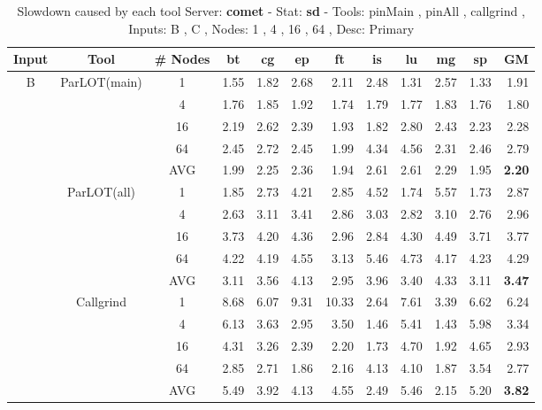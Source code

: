 \begin{table*}[]
\caption{Slowdown caused by each tool Server: \textbf{comet} - 
 Stat: \textbf{sd} - 
 Tools: pinMain , pinAll , callgrind ,  
 Inputs: B , C ,  
 Nodes: 1 , 4 , 16 , 64 ,  
 Desc: Primary}
\label{comet_sd_pMpAcg_BC_itn_p3.5}\begin{center}

\begin{tabular}{|c|c|c|rrrrrrrr|r|}
\hline
Input & Tool & \# Nodes  & \multicolumn{1}{c}{bt} & \multicolumn{1}{c}{cg} & \multicolumn{1}{c}{ep} & \multicolumn{1}{c}{ft} & \multicolumn{1}{c}{is} & \multicolumn{1}{c}{lu} & \multicolumn{1}{c}{mg} & \multicolumn{1}{c|}{sp} & \multicolumn{1}{c|}{GM} \\ \hline
\multirow{15}{*}{B} & \multirow{5}{*}{ParLOT(main)} & 1 & 1.55 & 1.82 & 2.68 & 2.11 & 2.48 & 1.31 & 2.57 & 1.33 & 1.91 \\
 &  & 4 & 1.76 & 1.85 & 1.92 & 1.74 & 1.79 & 1.77 & 1.83 & 1.76 & 1.80 \\
 &  & 16 & 2.19 & 2.62 & 2.39 & 1.93 & 1.82 & 2.80 & 2.43 & 2.23 & 2.28 \\
 &  & 64 & 2.45 & 2.72 & 2.45 & 1.99 & 4.34 & 4.56 & 2.31 & 2.46 & 2.79 \\ \cline{3-12} 
 &  & AVG & 1.99 & 2.25 & 2.36 & 1.94 & 2.61 & 2.61 & 2.29 & 1.95 & \textbf{2.20} \\ \cline{2-12} 
 & \multirow{5}{*}{ParLOT(all)} & 1 & 1.85 & 2.73 & 4.21 & 2.85 & 4.52 & 1.74 & 5.57 & 1.73 & 2.87 \\
 &  & 4 & 2.63 & 3.11 & 3.41 & 2.86 & 3.03 & 2.82 & 3.10 & 2.76 & 2.96 \\
 &  & 16 & 3.73 & 4.20 & 4.36 & 2.96 & 2.84 & 4.30 & 4.49 & 3.71 & 3.77 \\
 &  & 64 & 4.22 & 4.19 & 4.55 & 3.13 & 5.46 & 4.73 & 4.17 & 4.23 & 4.29 \\ \cline{3-12} 
 &  & AVG & 3.11 & 3.56 & 4.13 & 2.95 & 3.96 & 3.40 & 4.33 & 3.11 & \textbf{3.47} \\ \cline{2-12} 
 & \multirow{5}{*}{Callgrind} & 1 & 8.68 & 6.07 & 9.31 & 10.33 & 2.64 & 7.61 & 3.39 & 6.62 & 6.24 \\
 &  & 4 & 6.13 & 3.63 & 2.95 & 3.50 & 1.46 & 5.41 & 1.43 & 5.98 & 3.34 \\
 &  & 16 & 4.31 & 3.26 & 2.39 & 2.20 & 1.73 & 4.70 & 1.92 & 4.65 & 2.93 \\
 &  & 64 & 2.85 & 2.71 & 1.86 & 2.16 & 4.13 & 4.10 & 1.87 & 3.54 & 2.77 \\ \cline{3-12} 
 &  & AVG & 5.49 & 3.92 & 4.13 & 4.55 & 2.49 & 5.46 & 2.15 & 5.20 & \textbf{3.82} \\ \hline

\end{tabular}
\end{center}
\end{table*}
